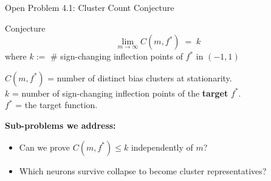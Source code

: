 \documentclass[aspectratio=169, 10pt]{beamer}
\newcommand{\fstar}{f^\ast}
\begin{document}
\begin{frame}{Open Problem 4.1: Cluster Count Conjecture}
  \begin{block}{Conjecture}
    \[
      \lim_{m \to \infty} C(m,\fstar) \;=\; k
    \]
    \vspace{-4pt}
    \small
    where $k :=$ \# sign-changing inflection points of $\fstar$ in $(-1,1)$
  \end{block}
  \vspace{0.6em}
  \small
  $C(m,\fstar)$ = number of distinct bias clusters at stationarity.\\[4pt]
  $k$ = number of sign-changing inflection points of the \textbf{target} $\fstar$.\\[4pt]
  $\fstar$ = the target function.

  \vspace{0.6em}
  \textbf{Sub-problems we address:}
  \begin{itemize}
    \item Can we prove $C(m,\fstar) \leq k$
          independently of $m$?
    \item Which neurons survive collapse
          to become cluster representatives?
  \end{itemize}
\end{frame}
\end{document}
